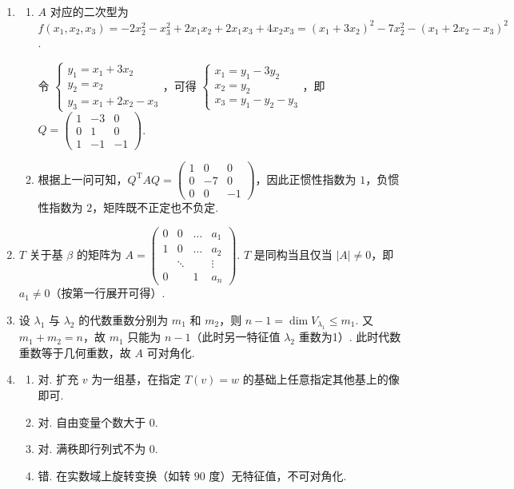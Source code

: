 \begin{enumerate}
    \item
    \begin{enumerate}
        \item $A$ 对应的二次型为 $f(x_1, x_2, x_3) = -2x_2^2 - x_3^2 + 2x_1x_2 + 2x_1x_3 + 4x_2x_3 = (x_1+3x_2)^2 - 7x_2^2 - (x_1+2x_2-x_3)^2$.

        令 $\begin{cases}
            y_1 = x_1 + 3x_2 \\
            y_2 = x_2 \\
            y_3 = x_1 + 2x_2 - x_3
        \end{cases}$，可得 $\begin{cases}
            x_1 = y_1 - 3y_2 \\
            x_2 = y_2 \\
            x_3 = y_1 - y_2 - y_3
        \end{cases}$，即 $Q=\begin{pmatrix}
            1 & -3 & 0 \\
            0 & 1 & 0 \\
            1 & -1 & -1
        \end{pmatrix}$.

        \item 根据上一问可知，$Q^\mathrm{T}AQ = \begin{pmatrix}
            1 & 0 & 0 \\
            0 & -7 & 0 \\
            0 & 0 & -1
        \end{pmatrix}$，因此正惯性指数为 $1$，负惯性指数为 $2$，矩阵既不正定也不负定.
    \end{enumerate}

    \item $T$ 关于基 $\beta$ 的矩阵为 $A = \begin{pmatrix} 0 & 0 & \dots & a_1 \\ 1 & 0 & \dots & a_2 \\ & \ddots & & \vdots \\ 0 & & 1 & a_n \end{pmatrix}$.
    $T$ 是同构当且仅当 $|A| \neq 0$，即 $a_1 \neq 0$（按第一行展开可得）.

    \item 设 $\lambda_1$ 与 $\lambda_2$ 的代数重数分别为 $m_1$ 和 $m_2$，则 $n-1 = \dim V_{\lambda_1} \leqslant m_1$. 又 $m_1 + m_2 = n$，故 $m_1$ 只能为 $n-1$（此时另一特征值 $\lambda_2$ 重数为1）.
    此时代数重数等于几何重数，故 $A$ 可对角化.

    \item
    \begin{enumerate}
        \item 对. 扩充 $v$ 为一组基，在指定 $T(v)=w$ 的基础上任意指定其他基上的像即可.
        \item 对. 自由变量个数大于 $0$.
        \item 对. 满秩即行列式不为 $0$.
        \item 错. 在实数域上旋转变换（如转 $90$ 度）无特征值，不可对角化.
    \end{enumerate}
\end{enumerate}

\clearpage
